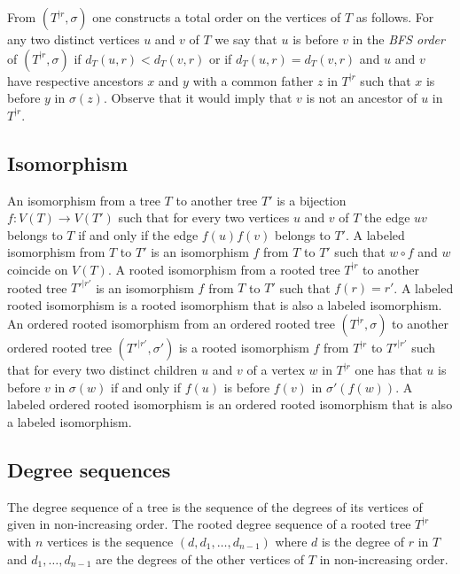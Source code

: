 \documentclass[11 pt]{modarticle}
\newcommand{\wmap}{w}
\newcommand{\compose}{\mathbin{\circ}}
\newcommand{\vsetof}[1]{V(#1)}
\newcommand{\distance}[3]{d_{#3}(#1,#2)}
\newcommand{\rtree}[2]{{#1}^{\lvert #2}}
\newcommand{\ortree}[3]{(\rtree{#1}{#2},{#3})}
\begin{document}
From $\ortree{T}{r}{\sigma}$ one constructs a total order on the vertices of $T$ as follows. For any two distinct vertices $u$ and $v$ of $T$ we say that $u$ is before $v$ in the \textit{BFS order} of $\ortree{T}{r}{\sigma}$ if $\distance{u}{r}{T} < \distance{v}{r}{T}$ or if $\distance{u}{r}{T} = \distance{v}{r}{T}$ and $u$ and $v$ have respective ancestors $x$ and $y$ with a common father $z$ in $\rtree{T}{r}$ such that $x$ is before $y$ in $\sigma(z)$. Observe that it would imply that $v$ is not an ancestor of $u$ in $\rtree{T}{r}$.


\subsection{Isomorphism}

An isomorphism from a tree $T$ to another tree $T'$ is a bijection $f\colon \vsetof{T} \to \vsetof{T'}$ such that for every two vertices $u$ and $v$ of $T$ the edge $uv$ belongs to $T$ if and only if the edge $f(u)f(v)$ belongs to $T'$. A labeled isomorphism from $T$ to $T'$ is an isomorphism $f$ from $T$ to $T'$ such that $\wmap \compose f$ and $\wmap$ coincide on $\vsetof{T}$. A rooted isomorphism from a rooted tree $\rtree{T}{r}$ to another rooted tree $\rtree{T'}{r'}$ is an isomorphism $f$ from $T$ to $T'$ such that $f(r) = r'$. A labeled rooted isomorphism is a rooted isomorphism that is also a labeled isomorphism. An ordered rooted isomorphism from an ordered rooted tree $\ortree{T}{r}{\sigma}$ to another ordered rooted tree $\ortree{T'}{r'}{\sigma'}$ is a rooted isomorphism $f$ from $\rtree{T}{r}$ to $\rtree{T'}{r'}$ such that for every two distinct children $u$ and $v$ of a vertex $w$ in $\rtree{T}{r}$ one has that $u$ is before $v$ in $\sigma(w)$ if and only if $f(u)$ is before $f(v)$ in $\sigma'(f(w))$. A labeled ordered rooted isomorphism is an ordered rooted isomorphism that is also a labeled isomorphism.

\subsection{Degree sequences}

The degree sequence of a tree %
is the sequence %
of the degrees of its vertices of given in non-increasing order. The rooted degree sequence of a rooted tree $\rtree{T}{r}$ with $n$ vertices is the sequence $(d, d_1, \dots, d_{n-1})$ where $d$ is the degree of $r$ in $T$ and $d_1, \dots, d_{n-1}$ are the degrees of the other vertices of $T$ in non-increasing order.
\end{document}
